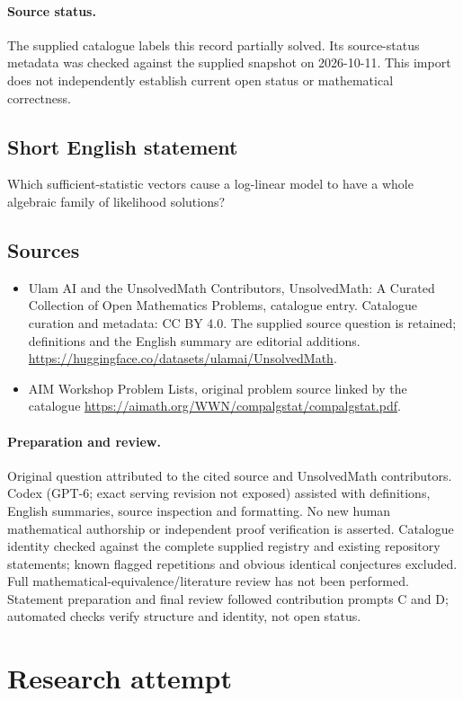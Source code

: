 \documentclass[11pt]{article}
\begin{document}
\paragraph{Source status.}
The supplied catalogue labels this record partially solved. Its source-status metadata was checked against the supplied snapshot on 2026-10-11. This import does not independently establish current open status or mathematical correctness.
\subsection{Short English statement}
Which sufficient-statistic vectors cause a log-linear model to have a whole algebraic family of likelihood solutions?
\subsection{Sources}
\begin{itemize}
\item[S1] Ulam AI and the UnsolvedMath Contributors, UnsolvedMath: A Curated Collection of Open Mathematics Problems, catalogue entry. Catalogue curation and metadata: CC BY 4.0. The supplied source question is retained; definitions and the English summary are editorial additions.
\url{https://huggingface.co/datasets/ulamai/UnsolvedMath}.
\item[S2] AIM Workshop Problem Lists, original problem source linked by the catalogue
\url{https://aimath.org/WWN/compalgstat/compalgstat.pdf}.
\end{itemize}
\paragraph{Preparation and review.}
Original question attributed to the cited source and UnsolvedMath contributors. Codex (GPT-6; exact serving revision not exposed) assisted with definitions, English summaries, source inspection and formatting. No new human mathematical authorship or independent proof verification is asserted. Catalogue identity checked against the complete supplied registry and existing repository statements; known flagged repetitions and obvious identical conjectures excluded. Full mathematical-equivalence/literature review has not been performed. Statement preparation and final review followed contribution prompts C and D; automated checks verify structure and identity, not open status.
\label{end:statement}


\section{Research attempt}
\end{document}
